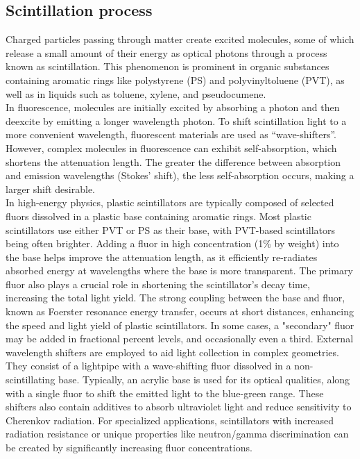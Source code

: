 \begin{refsection}
    \subsection{Scintillation process}
        Charged particles passing through matter create excited molecules, some of which release a small amount of their energy as optical photons through a process known as scintillation. This phenomenon is prominent in organic substances containing aromatic rings like polystyrene (PS) and polyvinyltoluene (PVT), as well as in liquids such as toluene, xylene, and pseudocumene.\\
        In fluorescence, molecules are initially excited by absorbing a photon and then deexcite by emitting a longer wavelength photon. To shift scintillation light to a more convenient wavelength, fluorescent materials are used as ``wave-shifters''.
        However, complex molecules in fluorescence can exhibit self-absorption, which shortens the attenuation length. 
        The greater the difference between absorption and emission wavelengths (Stokes' shift), the less self-absorption occurs, making a larger shift desirable.\\
        
        \noindent
        In high-energy physics, plastic scintillators are typically composed of selected fluors dissolved in a plastic base containing aromatic rings. Most plastic scintillators use either PVT or PS as their base, with PVT-based scintillators being often brighter. 
        Adding a fluor in high concentration (1\% by weight) into the base helps improve the attenuation length, as it efficiently re-radiates absorbed energy at wavelengths where the base is more transparent.
        The primary fluor also plays a crucial role in shortening the scintillator's decay time, increasing the total light yield. 
        The strong coupling between the base and fluor, known as Foerster resonance energy transfer, occurs at short distances, enhancing the speed and light yield of plastic scintillators.
        In some cases, a "secondary" fluor may be added in fractional percent levels, and occasionally even a third.
        External wavelength shifters are employed to aid light collection in complex geometries. They consist of a lightpipe with a wave-shifting fluor dissolved in a non-scintillating base. Typically, an acrylic base is used for its optical qualities, along with a single fluor to shift the emitted light to the blue-green range. These shifters also contain additives to absorb ultraviolet light and reduce sensitivity to Cherenkov radiation.
        \noindent
        For specialized applications, scintillators with increased radiation resistance or unique properties like neutron/gamma discrimination can be created by significantly increasing fluor concentrations.
        

\end{refsection}
